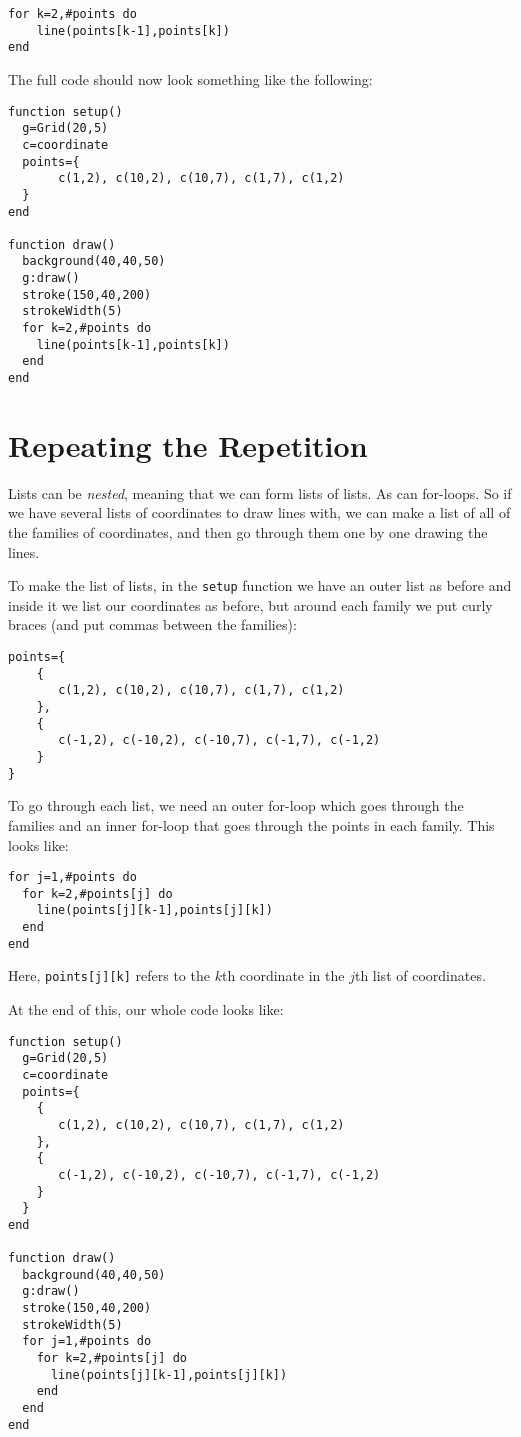 \documentclass[
  xhtml,%
  use filename%
]{internet}
\begin{document}
\begin{verbatim}
for k=2,#points do
    line(points[k-1],points[k])
end
\end{verbatim}

The full code should now look something like the following:

\begin{verbatim}
function setup()
  g=Grid(20,5)
  c=coordinate
  points={
       c(1,2), c(10,2), c(10,7), c(1,7), c(1,2)
  }
end

function draw()
  background(40,40,50)
  g:draw()
  stroke(150,40,200)
  strokeWidth(5)
  for k=2,#points do
    line(points[k-1],points[k])
  end
end
\end{verbatim}

\section{Repeating the Repetition}

Lists can be \emph{nested}, meaning that we can form lists of lists.
As can for-loops.
So if we have several lists of coordinates to draw lines with, we can make a list of all of the families of coordinates, and then go through them one by one drawing the lines.

To make the list of lists, in the \verb+setup+ function we have an outer list as before and inside it we list our coordinates as before, but around each family we put curly braces (and put commas between the families):

\begin{verbatim}
points={
    {
       c(1,2), c(10,2), c(10,7), c(1,7), c(1,2)
    },
    {
       c(-1,2), c(-10,2), c(-10,7), c(-1,7), c(-1,2)
    }
}
\end{verbatim}

To go through each list, we need an outer for-loop which goes through the families and an inner for-loop that goes through the points in each family.
This looks like:

\begin{verbatim}
for j=1,#points do
  for k=2,#points[j] do
    line(points[j][k-1],points[j][k])
  end
end
\end{verbatim}

Here, \verb+points[j][k]+ refers to the \(k\)th coordinate in the \(j\)th list of coordinates.

At the end of this, our whole code looks like:

\begin{verbatim}
function setup()
  g=Grid(20,5)
  c=coordinate
  points={
    {
       c(1,2), c(10,2), c(10,7), c(1,7), c(1,2)
    },
    {
       c(-1,2), c(-10,2), c(-10,7), c(-1,7), c(-1,2)
    }
  }
end

function draw()
  background(40,40,50)
  g:draw()
  stroke(150,40,200)
  strokeWidth(5)
  for j=1,#points do
    for k=2,#points[j] do
      line(points[j][k-1],points[j][k])
    end
  end
end
\end{verbatim}
\end{document}
